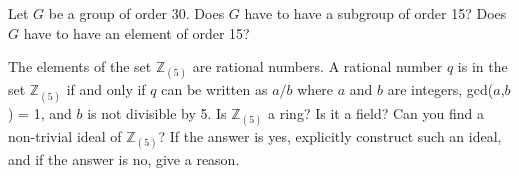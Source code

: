 \documentclass[12pt,letterpaper,boxed]{hmcpset}
\begin{document}
\begin{solution}
\end{solution}

\clearpage

\begin{problem}[12.3.12]
Let $G$ be a group of order 30. Does $G$ have to have a subgroup of order 15? Does $G$ have to have an element of order 15?
\end{problem}

\begin{solution}
\end{solution}

\clearpage

\begin{problem}[16.1.9]
The elements of the set $\mathbb{Z}_{(5)}$ are rational numbers. A rational number $q$ is in the set $\mathbb{Z}_{(5)}$ if and only if $q$ can be written as $a/b$ where $a$ and $b$ are integers, gcd($a$,$b$) = 1, and $b$ is not divisible by 5. Is $\mathbb{Z}_{(5)}$ a ring? Is it a field? Can you find a non-trivial ideal of $\mathbb{Z}_{(5)}$? If the answer is yes, explicitly construct such an ideal, and if the answer is no, give a reason.
\end{problem}

\begin{solution}
\end{solution}
\end{document}
